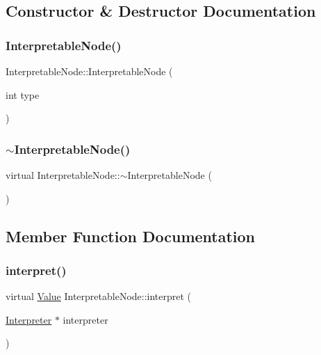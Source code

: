\subsection{Constructor \& Destructor Documentation}
\mbox{\label{classInterpretableNode_aeaf40b6165fe9810943c24f7037e03c1}} 
\subsubsection{\texorpdfstring{Interpretable\+Node()}{InterpretableNode()}}
{\footnotesize\ttfamily Interpretable\+Node\+::\+Interpretable\+Node (\begin{DoxyParamCaption}\item[{int}]{type }\end{DoxyParamCaption})}

\mbox{\label{classInterpretableNode_a36f9960c9cfe7267fc518bd5e5462e2e}} 
\subsubsection{\texorpdfstring{$\sim$\+Interpretable\+Node()}{~InterpretableNode()}}
{\footnotesize\ttfamily virtual Interpretable\+Node\+::$\sim$\+Interpretable\+Node (\begin{DoxyParamCaption}{ }\end{DoxyParamCaption})\hspace{0.3cm}{\ttfamily [virtual]}}



\subsection{Member Function Documentation}
\mbox{\label{classInterpretableNode_a9a466e7d65c4b323d2b96b4ac8396cd7}} 
\subsubsection{\texorpdfstring{interpret()}{interpret()}}
{\footnotesize\ttfamily virtual \hyperlink{classValue}{Value} Interpretable\+Node\+::interpret (\begin{DoxyParamCaption}\item[{\hyperlink{classInterpreter}{Interpreter} $\ast$}]{interpreter }\end{DoxyParamCaption})\hspace{0.3cm}{\ttfamily [pure virtual]}}




